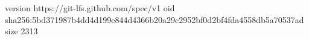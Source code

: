 version https://git-lfs.github.com/spec/v1
oid sha256:5bd371987b4dd4d199e844d4366b20a29c2952bf0d2bf4fda4558db5a70537ad
size 2313
